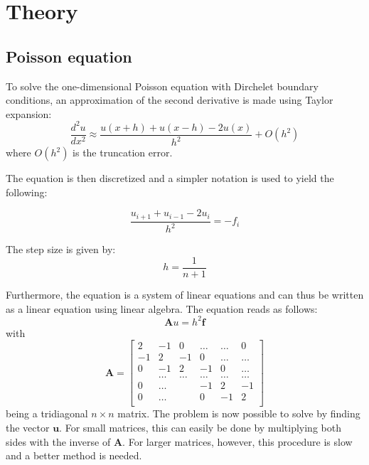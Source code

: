 \documentclass[12pt]{article}
\begin{document}
\section{Theory}
\subsection{Poisson equation}
To solve the one-dimensional Poisson equation with Dirchelet boundary conditions, an approximation of the second derivative is made using Taylor expansion:
\begin{equation}
\frac{d^{2}u}{dx^{2}}\approx\frac{u(x+h)+u(x-h)-2u(x)}{h^{2}}+O(h^{2})
\end{equation}
where $O(h^{2})$ is the truncation error. 

The equation is then discretized and a simpler notation is used to yield the following:

\begin{equation}
\frac{u_{i+1}+u_{i-1}-2u_{i}}{h^{2}}=-f_{i}
\end{equation}

The step size is given by:
\begin{equation}
h = \frac{1}{n+1}
\end{equation}

Furthermore, the equation is a system of linear equations and can thus be written as a linear equation using linear algebra. The equation reads as follows:
\begin{equation}
\mathbf{A}u=h^{2}\mathbf{f}
\end{equation}
with
\begin{equation}
\mathbf{A} = \begin{bmatrix}
                           2& -1& 0 &\dots   & \dots &0 \\
                           -1 & 2 & -1 &0 &\dots &\dots \\
                           0&-1 &2 & -1 & 0 & \dots \\
                           & \dots   & \dots &\dots   &\dots & \dots \\
                           0&\dots   &  &-1 &2& -1 \\
                           0&\dots    &  & 0  &-1 & 2 \\
                      \end{bmatrix}
                      \label{eq:tridiagm}
\end{equation}
being a tridiagonal  $n\times n$ matrix. The problem is now possible to solve by finding the vector $\mathbf{u}$. For small matrices, this can easily be done by multiplying both sides with the inverse of $\mathbf{A}$. For larger matrices, however, this procedure is slow and a better method is needed. 
\end{document}
